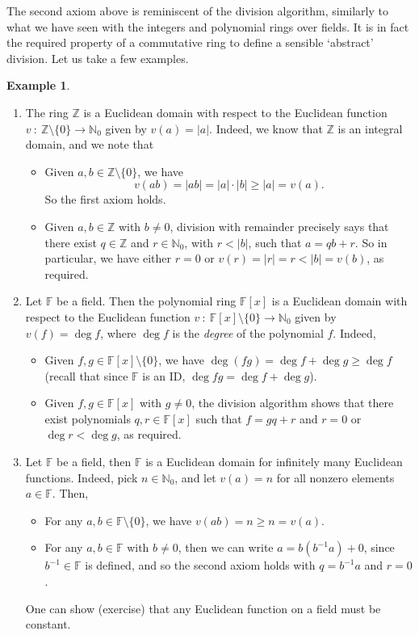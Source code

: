\documentclass[12pt]{article}
\theoremstyle{definition}
\newtheorem{example}[thm]{Example}
\newcounter{ex}\renewcommand\theex{\arabic{ex}}
\newcommand{\N}{\ensuremath{\mathbb{N}}}
\newcommand{\Z}{\ensuremath{\mathbb{Z}}}
\newcommand{\F}{\ensuremath{\mathbb{F}}}
\begin{document}
The second axiom above is reminiscent of the division algorithm,
similarly to what we have seen with the integers and polynomial rings
over fields. It is in fact the required property of a commutative ring
to define a sensible `abstract' division. Let us take a few examples.

\begin{example}\label{ex:ed} 
\begin{enumerate}
\item The ring $\Z$ is a Euclidean domain with
respect to the Euclidean function
$v~:~\Z\setminus\{0\}\to\N_0$ given by $v(a)=|a|$. 
Indeed, we know that $\Z$ is an integral domain, and we note that 
\begin{itemize}
\item Given $a,b\in\Z\setminus\{0\}$, we have 
$$v(ab)=|ab|=|a|\cdot|b|\geq|a|=v(a).$$ 
So the first axiom holds.
\item Given $a,b\in\Z$ with $b\neq0$, division
with remainder precisely says that there exist
$q\in\Z$ and $r\in\N_0$, with $r<|b|$, such that $a=qb+r$. So in
particular, we have either $r=0$ or $v(r)=|r|=r<|b|=v(b)$, as required.
\end{itemize}
\item Let $\F$ be a field. Then the polynomial
ring $\F[x]$ is a Euclidean domain with respect to the Euclidean
function $v~:~\F[x]\setminus\{0\}\to\N_0$ given by $v(f)=\deg f$,
where $\deg f$ is the {\em degree} of the polynomial $f$. Indeed,
\begin{itemize}
\item Given $f,g\in\F[x]\setminus\{0\}$, we have 
$\deg(fg)=\deg f+\deg g\geq\deg f$ (recall that since $\F$ is an ID,
$\deg fg=\deg f+\deg g$).
\item Given $f,g\in\F[x]$ with $g\neq0$, the division algorithm 
shows that there exist polynomials $q,r\in\F[x]$ such that $f=gq+r$
and $r=0$ or $\deg r<\deg g$, as required.
\end{itemize}
\item Let $\F$ be a field, then $\F$ is a Euclidean domain for
infinitely many Euclidean functions.
Indeed, pick $n\in\N_0$, and let $v(a)=n$ for all nonzero elements
$a\in\F$. Then,
\begin{itemize}\item
For any $a,b\in\F\setminus\{0\}$, we have 
$v(ab)=n\geq n=v(a)$.
\item
For any $a,b\in\F$ with $b\neq0$, then we can write
$a=b(b^{-1}a)+0$, since $b^{-1}\in\F$ is defined, and so the second
axiom holds with $q=b^{-1}a$ and $r=0$.
\end{itemize}
One can show (exercise) that any Euclidean function on a field must be
constant.
\end{enumerate}
\end{example}
\end{document}
